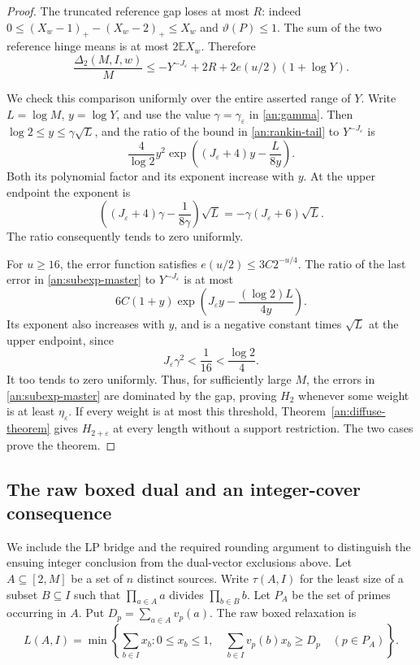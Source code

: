 \begin{proof}
The truncated reference gap loses at most \(R\): indeed
\(0\le(X_w-1)_+-(X_w-2)_+\le X_w\) and
\(\vartheta(P)\le1\). The sum of the two reference hinge means is
at most \(2\mathbb E X_w\). Therefore
\begin{equation}
 \frac{\Delta_2(M,I,w)}M
 \le-Y^{-J_\varepsilon}+2R+2e(u/2)(1+\log Y).
 \label{an:subexp-master}
\end{equation}

We check this comparison uniformly over the entire asserted range of
\(Y\). Write \(L=\log M\), \(y=\log Y\), and use the value
\(\gamma=\gamma_\varepsilon\) in \eqref{an:gamma}. Then
\(\log2\le y\le\gamma\sqrt L\), and the ratio of the bound in
\eqref{an:rankin-tail} to \(Y^{-J_\varepsilon}\) is
\[
 \frac4{\log2}y^2
 \exp\left((J_\varepsilon+4)y-\frac{L}{8y}\right).
\]
Both its polynomial factor and its exponent increase with \(y\).
At the upper endpoint the exponent is
\[
 \left((J_\varepsilon+4)\gamma-\frac1{8\gamma}\right)\sqrt L
 =-\gamma(J_\varepsilon+6)\sqrt L.
\]
The ratio consequently tends to zero uniformly.

For \(u\ge16\), the error function satisfies
\(e(u/2)\le3C2^{-u/4}\). The ratio of the last error in
\eqref{an:subexp-master} to \(Y^{-J_\varepsilon}\) is at most
\[
 6C(1+y)\exp\left(J_\varepsilon y-
                        \frac{(\log2)L}{4y}\right).
\]
Its exponent also increases with \(y\), and is a negative constant
times \(\sqrt L\) at the upper endpoint, since
\[
 J_\varepsilon\gamma^2<\frac1{16}<\frac{\log2}{4}.
\]
It too tends to zero uniformly. Thus, for sufficiently large \(M\),
the errors in \eqref{an:subexp-master} are dominated by the gap,
proving \(H_2\) whenever some weight is at least
\(\eta_\varepsilon\). If every weight is at most this threshold,
Theorem~\ref{an:diffuse-theorem} gives \(H_{2+\varepsilon}\) at every
length without a support restriction. The two cases prove the theorem.
\end{proof}

\subsection{The raw boxed dual and an integer-cover consequence}

We include the LP bridge and the required rounding argument to distinguish
the ensuing integer conclusion from the dual-vector exclusions above.
Let \(A\subseteq[2,M]\) be a set of \(n\) distinct sources. Write
\(\tau(A,I)\) for the least size of a subset \(B\subseteq I\) such
that \(\prod_{a\in A}a\) divides \(\prod_{b\in B}b\). Let
\(P_A\) be the set of primes occurring in \(A\). Put
\(D_p=\sum_{a\in A}v_p(a)\). The raw boxed relaxation is
\begin{equation}
 L(A,I)=\min\left\{\sum_{b\in I}x_b:
 0\le x_b\le1,\quad
 \sum_{b\in I}v_p(b)x_b\ge D_p\quad(p\in P_A)\right\}.
 \label{an:raw-lp}
\end{equation}

